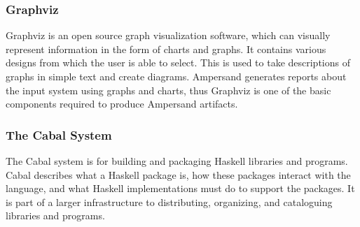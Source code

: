 \documentclass[12pt]{report}
\begin{document}
\subsubsection*{Graphviz}
Graphviz is an open source graph visualization software, which can
visually represent information in the form of charts and graphs. It contains
various designs from which the user is able to select. This is used to take
descriptions of graphs in simple text and create diagrams. Ampersand generates
reports about the input system using graphs and charts, thus Graphviz is one of 
the basic components required to produce Ampersand artifacts.

\subsubsection{The Cabal System}
The Cabal system is for building and packaging Haskell libraries and programs. 
Cabal describes what a Haskell package is, how these packages interact with the 
language, and what Haskell implementations must do to support the packages. It 
is part of a larger infrastructure to distributing, organizing, and cataloguing 
libraries and programs. \cite{hackage}

%
\end{document}
